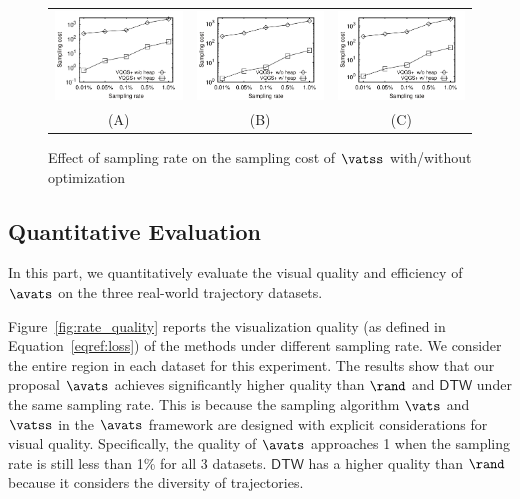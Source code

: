 \begin{figure}
	\centering
	\small
	\begin{tabular}{ccc}
		\includegraphics[width=0.22\linewidth]{pictures/quantitative_study/vqgs_porto_t}
		&
		\includegraphics[width=0.22\linewidth]{pictures/quantitative_study/vqgs_sz_t}
		&
		\includegraphics[width=0.22\linewidth]{pictures/quantitative_study/vqgs_cd_t}
		\\
		(A) \pt{}
		&
		(B) \sz{}
		&
		(C) \cd{}
	\end{tabular}
    \trim
	\caption{Effect of sampling rate on the sampling cost of $\vatss$ with/without optimization}
	\label{fig:rate_algtime}
	\trim \trim
\end{figure}

\subsection{Quantitative Evaluation}\label{sec:quality}
In this part, we quantitatively evaluate the visual quality and efficiency of $\avats$ on the three real-world trajectory datasets.

 Figure~\ref{fig:rate_quality} reports the visualization quality (as defined in Equation~\eqref{eqref:loss}) of the methods under different sampling rate.
We consider the entire region in each dataset for this experiment.
The results show that our proposal $\avats$ achieves significantly higher quality than $\rand$ and $\mathsf{DTW}$ under the same sampling rate.
This is because the sampling algorithm $\vats$ and $\vatss$ in the $\avats$ framework are designed with explicit considerations for visual quality.
Specifically, the quality of $\avats$ approaches 1 when the sampling rate is still less than 1\% for all 3 datasets.
$\mathsf{DTW}$ has a higher quality than $\rand$ because it considers the diversity of trajectories.


